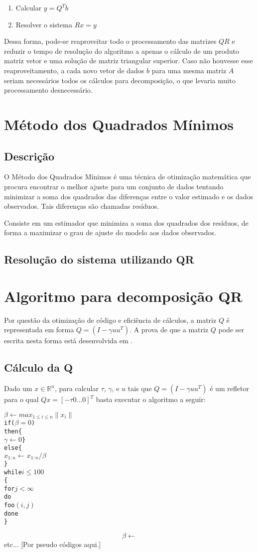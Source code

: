 	\begin{enumerate}
	\item Calcular $y = Q^Tb$
	\item Resolver o sistema $Rx = y$
	\end{enumerate}
	
	Dessa forma, pode-se reaproveitar todo o processamento das matrizes $QR$ e reduzir o tempo de resolução do algoritmo
	a apenas o cálculo de um produto matriz vetor e uma solução de matriz triangular superior.
	Caso não houvesse esse reaproveitamento, a cada novo vetor de dados $b$ para uma mesma matriz $A$ seriam necessários todos os cálculos para decomposição, o que levaria muito processamento desnecessário.
\chapter{Método dos Quadrados Mínimos}

	\section{Descrição}
	O Método dos Quadrados Mínimos é uma técnica de otimização matemática que procura encontrar o melhor ajuste para um 
	conjunto de dados tentando minimizar a soma dos quadrados das diferenças entre o valor estimado e os dados observados.
	Tais diferenças são chamadas resíduos.
	
	
	Consiste em um estimador que minimiza a soma dos quadrados dos resíduos, de forma a maximizar o grau de ajuste do modelo aos dados observados.\cite{wikipedia}
	
	\section{Resolução do sistema utilizando QR}


\chapter{Algoritmo para decomposição QR}
Por questão da otimização de código e eficiência de cálculos, a matriz $Q$ é representada em forma $Q = (I - \gamma uu^T)$. A prova de que a matriz $Q$ pode ser escrita nesta forma está desenvolvida em \cite{watkins}.

\section{Cálculo da Q}
	Dado um $x \in \mathbb{R}^n$, para calcular $\tau$, $\gamma$, e $u$ tais que $Q = (I - \gamma uu^T)$ é um refletor para o qual $Qx = [-\tau 0 \ldots 0]^T$ basta executar o algoritmo a seguir:


\begin{alltt}
  \( \beta \leftarrow max_{1 \le i \le n} \|x_i\| \)
  if(\(\beta = 0\))
  then \{
  		\(\gamma \leftarrow 0\)\}
  else \{
  		\(x_{1:n} \leftarrow x_{1:n}/\beta\)
  	\}
  while \(i \leq 100\)
  \{
    for \(j < \infty\)
    do
      foo\((i,j)\)
    done
  \}
\end{alltt}

	\[\beta \leftarrow \]
	\[\]
etc... [Por pseudo códigos aqui.]


